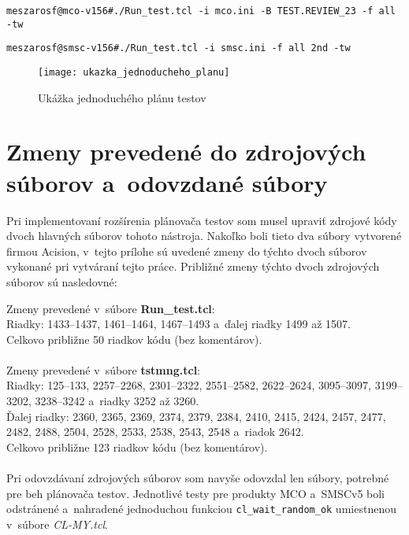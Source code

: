 \begin{lstlisting}[caption=Spúšťanie regresných testov v~produkte MCO
,label=priklad:prilohy_regresie_mco]
meszarosf@mco-v156#./Run_test.tcl -i mco.ini -B TEST.REVIEW_23 -f all -tw
\end{lstlisting}


\begin{lstlisting}[caption=Spúšťanie regresných testov v~produkte SMSCv5
,label=priklad:prilohy_regresie_smsc]
meszarosf@smsc-v156#./Run_test.tcl -i smsc.ini -f all 2nd -tw
\end{lstlisting}

\begin{figure}[h]
  \texttt{[image: ukazka\_jednoducheho\_planu]}
  \caption{Ukážka jednoduchého plánu testov}
\end{figure}

%
%
\chapter{Zmeny prevedené do zdrojových súborov a~odovzdané súbory}
\label{priloha:zmeny_do_zdrojakov}
Pri implementovaní rozšírenia plánovača testov som musel upraviť zdrojové
kódy dvoch hlavných súborov tohoto nástroja. 
Nakoľko boli tieto dva súbory vytvorené firmou Acision, v~tejto prílohe
sú uvedené zmeny do týchto dvoch súborov vykonané pri vytváraní tejto
práce. Približné zmeny týchto dvoch zdrojových súborov sú nasledovné:

\noindent Zmeny prevedené v~súbore \textbf{Run\_test.tcl}: \\
Riadky: 1433--1437, 1461--1464, 1467--1493 a~ďalej riadky 1499 až 1507.\\
Celkovo približne 50 riadkov kódu (bez komentárov).
\\
\\
\noindent Zmeny prevedené v~súbore \textbf{tstmng.tcl}: \\
Riadky: 125--133, 2257--2268, 2301--2322, 2551--2582, 2622--2624, 
3095--3097, 3199--3202, 3238--3242 a~riadky 3252 až 3260. \\
Ďalej riadky: 2360, 2365, 2369, 2374, 2379, 2384, 2410, 2415, 2424, 
2457, 2477, 2482, 2488, 2504, 2528, 2533, 2538, 2543, 2548 a~riadok 2642. \\
Celkovo približne 123 riadkov kódu (bez komentárov).
\\
\\
Pri odovzdávaní zdrojových súborov som navyše odovzdal len súbory,
potrebné pre beh plánovača testov. Jednotlivé testy pre produkty MCO
a~SMSCv5 boli odstránené a~nahradené jednoduchou funkciou 
\texttt{cl\_wait\_random\_ok} umiestnenou v~súbore \textit{CL-MY.tcl}. 

